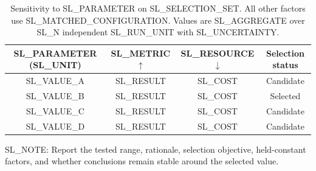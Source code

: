 \begin{table}[t]
  \centering
  \small
  \caption{Sensitivity to SL_PARAMETER on SL_SELECTION_SET. All other factors
  use SL_MATCHED_CONFIGURATION. Values are SL_AGGREGATE over SL_N independent
  SL_RUN_UNIT with SL_UNCERTAINTY.}
  \label{tab:SL_LABEL}
  \begin{tabular}{cccc}
    \toprule
    SL_PARAMETER (SL_UNIT) & SL_METRIC $\uparrow$ & SL_RESOURCE $\downarrow$ &
    Selection status \\
    \midrule
    SL_VALUE_A & SL_RESULT & SL_COST & Candidate \\
    SL_VALUE_B & SL_RESULT & SL_COST & Selected \\
    SL_VALUE_C & SL_RESULT & SL_COST & Candidate \\
    SL_VALUE_D & SL_RESULT & SL_COST & Candidate \\
    \bottomrule
  \end{tabular}
  \vspace{2pt}

  \parbox{0.98\linewidth}{\footnotesize
  SL_NOTE: Report the tested range, rationale, selection objective, held-constant
  factors, and whether conclusions remain stable around the selected value.}
\end{table}
